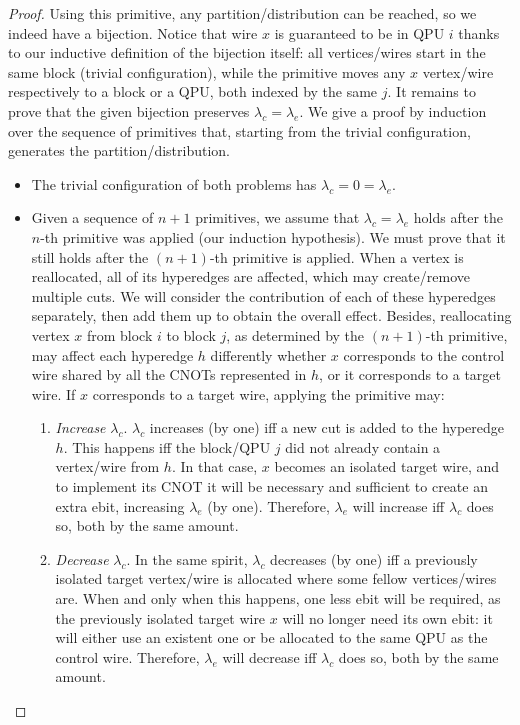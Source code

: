 \begin{proof}
Using this primitive, any partition/distribution can be reached, so we indeed have a bijection. Notice that wire \(x\) is guaranteed to be in QPU \(i\) thanks to our inductive definition of the bijection itself: all vertices/wires start in the same block (trivial configuration), while the primitive moves any \(x\) vertex/wire respectively to a block or a QPU, both indexed by the same \(j\). It remains to prove that the given bijection preserves \(\lambda_c = \lambda_e\). We give a proof by induction over the sequence of primitives that, starting from the trivial configuration, generates the partition/distribution.

\begin{itemize}
  \item The trivial configuration of both problems has \(\lambda_c = 0 = \lambda_e\).
  \item Given a sequence of \(n+1\) primitives, we assume that \(\lambda_c = \lambda_e\) holds after the \(n\)-th primitive was applied (our induction hypothesis). We must prove that it still holds after the \((n+1)\)-th primitive is applied. When a vertex is reallocated, all of its hyperedges are affected, which may create/remove multiple cuts. We will consider the contribution of each of these hyperedges separately, then add them up to obtain the overall effect. Besides, reallocating vertex \(x\) from block \(i\) to block \(j\), as determined by the \((n+1)\)-th primitive, may affect each hyperedge \(h\) differently whether \(x\) corresponds to the control wire shared by all the CNOTs represented in \(h\), or it corresponds to a target wire. If \(x\) corresponds to a target wire, applying the primitive may:
    \begin{enumerate}
    \renewcommand{\theenumi}{\alph{enumi})}
      \item \textit{Increase} \(\lambda_c\). \(\lambda_c\) increases (by one) iff a new cut is added to the hyperedge \(h\). This happens iff the block/QPU \(j\) did not already contain a vertex/wire from \(h\). In that case, \(x\) becomes an isolated target wire, and to implement its CNOT it will be necessary and sufficient to create an extra ebit, increasing \(\lambda_e\) (by one). Therefore, \(\lambda_e\) will increase iff \(\lambda_c\) does so, both by the same amount.
      \item \textit{Decrease} \(\lambda_c\). In the same spirit, \(\lambda_c\) decreases (by one) iff a previously isolated target vertex/wire is allocated where some fellow vertices/wires are. When and only when this happens, one less ebit will be required, as the previously isolated target wire \(x\) will no longer need its own ebit: it will either use an existent one or be allocated to the same QPU as the control wire. Therefore, \(\lambda_e\) will decrease iff \(\lambda_c\) does so, both by the same amount.
    \end{enumerate}
\end{itemize}


\end{proof}
